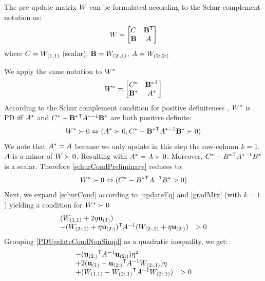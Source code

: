 \documentclass{article}
\begin{document}
The pre-update matrix ${W}$ can be formulated according to the Schur complement notation as: 
\begin{equation}
{W}= \left[ \begin{matrix} C & \mathbf{B{}^\mathsf{T}} \\ \mathbf{B} & {A} \end{matrix} \right]
\label{schurNotationPreUpdate}
\end{equation}
where $C = {W}_{(1,1)}$ (scalar), $\mathbf{B} = {W}_{(2:,1)}$, ${A} = {W}_{(2:,2:)}$

We apply the same notation to ${{W^*}}$
\begin{equation}
{{{W^*}}}= \left[ \begin{matrix} C^* & \mathbf{B^*}{}^\mathsf{T} \\ \mathbf{B^*} & {A^*} \end{matrix} \right]
\end{equation}
According to the Schur complement condition for positive definiteness , ${{W^*}}$ is PD iff ${A}^*$ and $C^* - \mathbf{B}^*{}^\mathsf{T} {A}^{*-1} \mathbf{B}^*$ are both positive definite:
\begin{equation}
{{W^*}} \succ  0 \Leftrightarrow ({A}^* \succ  0, C^* - \mathbf{B}^*{}^\mathsf{T} {A}^{*-1} \mathbf{B}^* \succ  0)
\label{schurCondPreliminary}
\end{equation}
We note that ${A}^* = {A}$ because we only update in this step the row-column $k=1$. ${A}$ is a minor of ${W} \succ  0$. Resulting with ${A}^*={A} \succ  0$. Moreover, $C^* - B^*{}^\mathsf{T} A^{*-1} B^*$ is a scalar. Therefore \eqref{schurCondPreliminary} reduces to:
\begin{equation}
{W^*} \succ  0 \Leftrightarrow (C^* - B^*{}^\mathsf{T} A^{-1} B^* >  0)
\label{schurCond}
\end{equation}
Next, we expand \eqref{schurCond} according to \eqref{updateEq} and \eqref{gradMtx} (with $k=1$) yielding a condition for ${{W^*}} \succ  0$
\begin{equation}
\begin{array}{ll} 
({W}_{(1,1)} + 2\eta \mathbf{u}_{(1)})  \\
-({W}_{(2:,1)} + \eta \mathbf{u}_{(2:)}){}^\mathsf{T} {A}^{-1} ({W}_{(2:,1)} + \eta \mathbf{u}_{(2:)})  & > 0
\end{array}
\label{PDUpdateCondNonSimpl}
\end{equation}
Grouping \eqref{PDUpdateCondNonSimpl} as a quadratic inequality, we get:
\begin{equation}
\begin{array}{ll} 
-(\mathbf{u}_{(2:)}{}^\mathsf{T} {A}^{-1} \mathbf{u}_{(2:)})\eta^2 \\
+2(\mathbf{u}_{(1)} - \mathbf{u}_{(2:)}{}^\mathsf{T} {A}^{-1}{W}_{(2:,1)})\eta\\
+({W}_{(1,1)} - {W}_{(2:,1)}{}^\mathsf{T}  {A}^{-1} {W}_{(2:,1)}) & > 0
\end{array}
\label{PDUpdateCondQuadFormWithW}
\end{equation}
\end{document}
